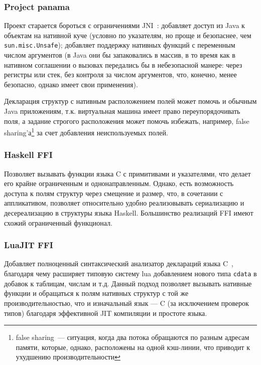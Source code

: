 \documentclass[times
]{itmo-student-thesis}
\begin{document}
\subsubsection{Project panama}
Проект старается бороться с ограничениями JNI~\cite{project-panama-overview}: добавляет доступ из Java к объектам на нативной куче (условно по указателям, но проще и безопаснее, чем \texttt{sun.misc.Unsafe}); добавляет поддержку нативных функций с переменным числом аргументов (в Java они бы запаковались в массив, в то время как в нативном соглашении о вызовах передались бы в небезопасной манере: через регистры или стек, без контроля за числом аргументов, что, конечно, менее безопасно, однако имеет свои применения).

Декларация структур с нативным расположением полей может помочь и обычным Java приложениям, т.к. виртуальная машина имеет право переупорядочивать поля, а задание строгого расположения может помочь избежать, например, false sharing'а\footnote{false sharing~--- ситуация, когда два потока обращаются по разным адресам памяти, которые, однако, расположены на одной кэш-линии, что приводит к ухудшению производительности} за счет добавления неиспользуемых полей.
\subsubsection{Haskell FFI}
Позволяет вызывать функции языка C с примитивами и указателями, что делает его крайне ограниченным и однонаправленным. Однако, есть возможность доступа к полям структур через смещение и размер, что, в сочетании с аппликативом, позволяет относительно удобно реализовывать сериализацию и десереализацию в структуры языка Haskell. Большинство реализаций FFI имеют схожий ограниченный функционал.
\subsubsection{LuaJIT FFI}\label{intro:luajitffi}
Добавляет полноценный синтаксический анализатор деклараций языка C~\cite{luajit}, благодаря чему расширяет типовую систему lua добавлением нового типа \texttt{cdata} в добавок к таблицам, числам и т.д. Данный подход позволяет вызывать нативные функции и обращаться к полям нативных структур с той же производительностью, что и изначальный язык --- C (за исключением проверок типов) благодаря эффективной JIT компиляции и простоте языка.
\end{document}
